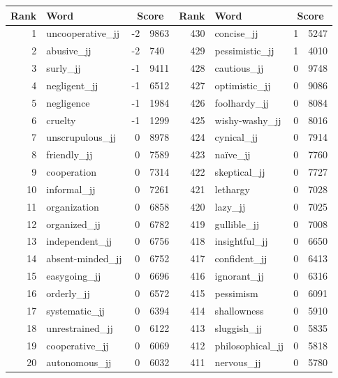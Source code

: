 \begin{table}[tbp]
    \begin{tabular}{| rlr@{.}l | rlr@{.}l |}
    \hline
    \textbf{Rank} & \textbf{Word} & \multicolumn{2}{c|}{\textbf{Score}} & \textbf{Rank} & \textbf{Word} & \multicolumn{2}{c|}{\textbf{Score}} \\
    \hline
    1 & uncooperative\_jj & -2 & 9863    &    430 & concise\_jj & 1 & 5247 \\
    2 & abusive\_jj & -2 & 740    &    429 & pessimistic\_jj & 1 & 4010 \\
    3 & surly\_jj & -1 & 9411    &    428 & cautious\_jj & 0 & 9748 \\
    4 & negligent\_jj & -1 & 6512    &    427 & optimistic\_jj & 0 & 9086 \\
    5 & negligence & -1 & 1984    &    426 & foolhardy\_jj & 0 & 8084 \\
    6 & cruelty & -1 & 1299    &    425 & wishy-washy\_jj & 0 & 8016 \\
    7 & unscrupulous\_jj & 0 & 8978    &    424 & cynical\_jj & 0 & 7914 \\
    8 & friendly\_jj & 0 & 7589    &    423 & naïve\_jj & 0 & 7760 \\
    9 & cooperation & 0 & 7314    &    422 & skeptical\_jj & 0 & 7727 \\
    10 & informal\_jj & 0 & 7261    &    421 & lethargy & 0 & 7028 \\
    11 & organization & 0 & 6858    &    420 & lazy\_jj & 0 & 7025 \\
    12 & organized\_jj & 0 & 6782    &    419 & gullible\_jj & 0 & 7008 \\
    13 & independent\_jj & 0 & 6756    &    418 & insightful\_jj & 0 & 6650 \\
    14 & absent-minded\_jj & 0 & 6752    &    417 & confident\_jj & 0 & 6413 \\
    15 & easygoing\_jj & 0 & 6696    &    416 & ignorant\_jj & 0 & 6316 \\
    16 & orderly\_jj & 0 & 6572    &    415 & pessimism & 0 & 6091 \\
    17 & systematic\_jj & 0 & 6394    &    414 & shallowness & 0 & 5910 \\
    18 & unrestrained\_jj & 0 & 6122    &    413 & sluggish\_jj & 0 & 5835 \\
    19 & cooperative\_jj & 0 & 6069    &    412 & philosophical\_jj & 0 & 5818 \\
    20 & autonomous\_jj & 0 & 6032    &    411 & nervous\_jj & 0 & 5780 \\

\end{tabular}
\end{table}

